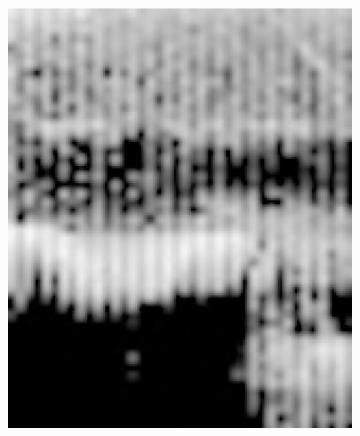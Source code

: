 \begin{figure}[h!]
	\centering
	
	\begin{subfigure}{0.45\textwidth}
		\includegraphics[width=\linewidth]{Images/DataMining/SpectrogramYesFirst.jpg}
		\caption{}    %
		\label{subfig:SpectrogramYesFirst}
	\end{subfigure}
	\hfill
	\begin{subfigure}{0.45\textwidth}

\end{subfigure}
\end{figure}
